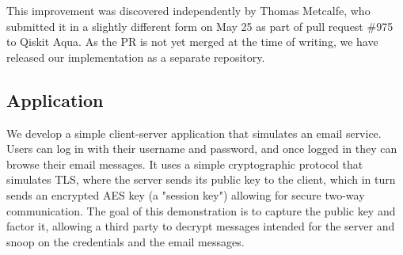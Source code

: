 \documentclass[conference]{IEEEtran}
\begin{document}
This improvement was discovered independently by Thomas Metcalfe, who submitted it in a slightly different form on May 25 as part of pull request \#975 to Qiskit Aqua. As the PR is not yet merged at the time of writing, we have released our implementation \cite{github-repo} as a separate repository.

\subsection{Application}
We develop a simple client-server application that simulates an email service. Users can log in with their username and password, and once logged in they can browse their email messages. It uses a simple cryptographic protocol that simulates TLS, where the server sends its public key to the client, which in turn sends an encrypted AES key (a "session key") allowing for secure two-way communication. The goal of this demonstration is to capture the public key and factor it, allowing a third party to decrypt messages intended for the server and snoop on the credentials and the email messages.






\end{document}
